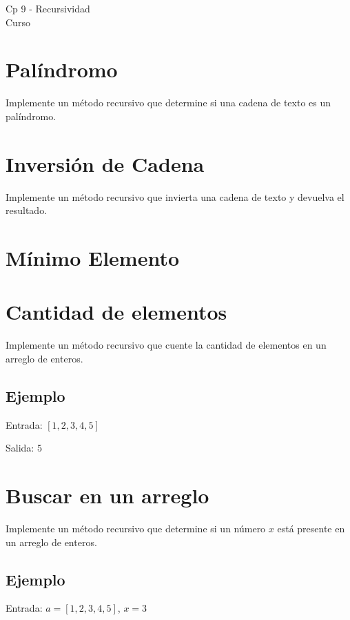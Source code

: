 \begin{center}
    \begin{large}
    Cp 9 - Recursividad\\
    Curso \academicyear\\
    \end{large}
\end{center}

\section{Palíndromo}  
Implemente un método recursivo que determine si una cadena de texto es un palíndromo.  

\section{Inversión de Cadena}  
Implemente un método recursivo que invierta una cadena de texto y devuelva el resultado.  

\section{Mínimo Elemento}  


\section{Cantidad de elementos}
Implemente un método recursivo que cuente la cantidad de elementos en un arreglo de enteros.
\subsection*{Ejemplo}
Entrada: \([1, 2, 3, 4, 5]\)

Salida: \( 5 \)

\section{Buscar en un arreglo}
Implemente un método recursivo que determine si un número \( x \) está presente en un arreglo de enteros.
\subsection*{Ejemplo}
Entrada: \(a = [1, 2, 3, 4, 5]\), \( x = 3 \)

